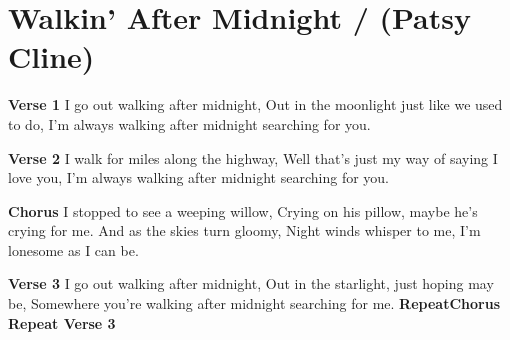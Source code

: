 \section{Walkin' After Midnight / (Patsy Cline)}\label{sec:walkin__after_midnight}
\textbf{Verse 1}
I go out walking after midnight,
Out in the moonlight just like we used to do,
I'm always walking after midnight searching for
you. 

\textbf{Verse 2}
I walk for miles along the highway,
Well that's just my way of saying I love you,
I'm always walking after midnight searching for
you. 

\textbf{Chorus}
I stopped to see a weeping willow,
Crying on his pillow, maybe he's crying for me.
And as the skies turn gloomy,
Night winds whisper to me, I'm lonesome as I can 
be.

\textbf{Verse 3}
I go out walking after midnight,
Out in the starlight, just hoping may be,
Somewhere you're walking after midnight 
searching for me.
\textbf{RepeatChorus}
\textbf{Repeat Verse 3}

